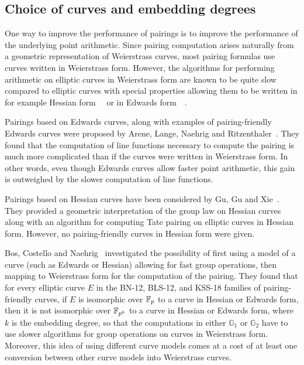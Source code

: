 
\subsection{Choice of curves and embedding degrees}

One way to improve the performance of pairings is
to improve the performance of the underlying point arithmetic.
Since pairing computation arises naturally from a geometric representation of Weierstrass curves,
most pairing formulas use curves written in Weierstrass form.
However, the algorithms for performing arithmetic on elliptic curves in Weierstrass form are known to be quite slow compared to elliptic curves with special properties allowing them to be written in
for example Hessian form~\cite{2001/smart}~\cite{2001/joye} or in
Edwards form~\cite{2007/edwards}~\cite{2007/bernstein-newelliptic}.

Pairings based on Edwards curves,
along with examples of pairing-friendly Edwards curves
were proposed by Arene, Lange, Naehrig and Ritzenthaler~\cite{2009/fastertate}.
They found that the computation of line functions necessary to compute the pairing is much more complicated than if the curves were written in Weierstrass form.
In other words,
even though Edwards curves allow faster point arithmetic,
this gain is outweighed by the slower computation of line functions.

Pairings based on Hessian curves have been considered by Gu, Gu and Xie~\cite{2010/Gu}.
They provided a geometric interpretation of the group law on Hessian curves
along with an algorithm for computing Tate pairing on elliptic curves in Hessian form.
However, no pairing-friendly curves in Hessian form were given.

Bos, Costello and Naehrig~\cite{2013/bos-pairing} investigated the possibility of first
using a model of a curve (such as Edwards or Hessian) allowing for fast group operations, then mapping to Weierstrass form for the computation of the pairing.
They found that for every elliptic curve $E$ in the BN-12, BLS-12, and KSS-18 families of pairing-friendly curves, if $E$ is isomorphic over $\mathbb{F}_{p}$ to a curve in Hessian or Edwards form, then it is not isomorphic over $\mathbb{F}_{p^{k}}$ to a curve in Hessian or Edwards form, where $k$ is the embedding degree, so that the computations in either $\mathbb{G}_1$ or $\mathbb{G}_2$ have to use slower algorithms for group operations on curves in Weierstrass form. Moreover, this idea of using different curve models comes at a cost of at least one conversion
between other curve models into Weierstrass curves.


